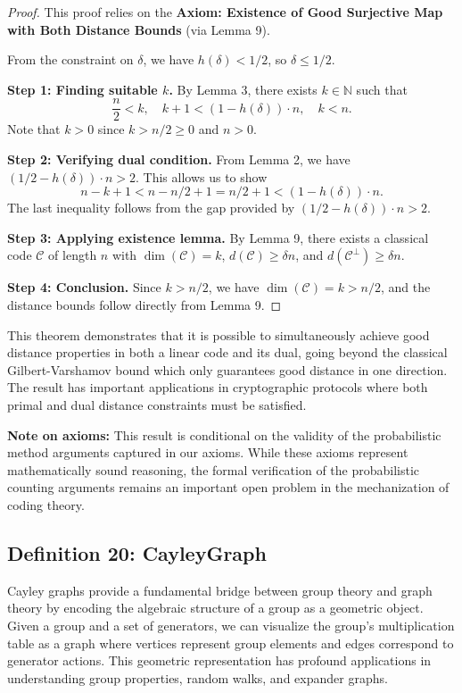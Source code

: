 \documentclass[11pt]{article}
\theoremstyle{plain}
\theoremstyle{definition}
\theoremstyle{remark}
\begin{document}
\begin{proof}
This proof relies on the \textbf{Axiom: Existence of Good Surjective Map with Both Distance Bounds} (via Lemma 9).

From the constraint on $\delta$, we have $h(\delta) < 1/2$, so $\delta \leq 1/2$.

\textbf{Step 1: Finding suitable $k$.} By Lemma 3, there exists $k \in \mathbb{N}$ such that
\[
\frac{n}{2} < k, \quad k + 1 < (1 - h(\delta)) \cdot n, \quad k < n.
\]
Note that $k > 0$ since $k > n/2 \geq 0$ and $n > 0$.

\textbf{Step 2: Verifying dual condition.} From Lemma 2, we have $(1/2 - h(\delta)) \cdot n > 2$. This allows us to show
\[
n - k + 1 < n - n/2 + 1 = n/2 + 1 < (1 - h(\delta)) \cdot n.
\]
The last inequality follows from the gap provided by $(1/2 - h(\delta)) \cdot n > 2$.

\textbf{Step 3: Applying existence lemma.} By Lemma 9, there exists a classical code $\mathcal{C}$ of length $n$ with $\dim(\mathcal{C}) = k$, $d(\mathcal{C}) \geq \delta n$, and $d(\mathcal{C}^\perp) \geq \delta n$.

\textbf{Step 4: Conclusion.} Since $k > n/2$, we have $\dim(\mathcal{C}) = k > n/2$, and the distance bounds follow directly from Lemma 9.
\end{proof}

This theorem demonstrates that it is possible to simultaneously achieve good distance properties in both a linear code and its dual, going beyond the classical Gilbert-Varshamov bound which only guarantees good distance in one direction. The result has important applications in cryptographic protocols where both primal and dual distance constraints must be satisfied.

\textbf{Note on axioms:} This result is conditional on the validity of the probabilistic method arguments captured in our axioms. While these axioms represent mathematically sound reasoning, the formal verification of the probabilistic counting arguments remains an important open problem in the mechanization of coding theory.

\vspace{1em}

\subsection{Definition 20: CayleyGraph}

Cayley graphs provide a fundamental bridge between group theory and graph theory by encoding the algebraic structure of a group as a geometric object. Given a group and a set of generators, we can visualize the group's multiplication table as a graph where vertices represent group elements and edges correspond to generator actions. This geometric representation has profound applications in understanding group properties, random walks, and expander graphs.
\end{document}
